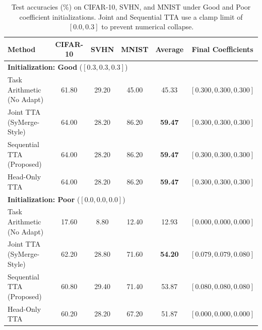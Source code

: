 \documentclass{article}
\theoremstyle{plain}
\theoremstyle{definition}
\theoremstyle{remark}
\begin{document}
\begin{table}[t]
\caption{Test accuracies (\%) on CIFAR-10, SVHN, and MNIST under Good and Poor coefficient initializations. Joint and Sequential TTA use a clamp limit of $[0.0, 0.3]$ to prevent numerical collapse.}
\label{tab:results}
\vskip 0.08in
\begin{center}
\begin{small}
\begin{sc}
\begin{tabular}{lccccc}
\toprule
Method & CIFAR-10 & SVHN & MNIST & Average & Final Coefficients \\
\midrule
\multicolumn{6}{l}{\textbf{Initialization: Good} ($[0.3, 0.3, 0.3]$)} \\
\midrule
Task Arithmetic (No Adapt) & 61.80 & 29.20 & 45.00 & 45.33 & $[0.300, 0.300, 0.300]$ \\
Joint TTA (SyMerge-Style)   & 64.00 & 28.20 & 86.20 & \textbf{59.47} & $[0.300, 0.300, 0.300]$ \\
Sequential TTA (Proposed)   & 64.00 & 28.20 & 86.20 & \textbf{59.47} & $[0.300, 0.300, 0.300]$ \\
Head-Only TTA               & 64.00 & 28.20 & 86.20 & \textbf{59.47} & $[0.300, 0.300, 0.300]$ \\
\midrule
\multicolumn{6}{l}{\textbf{Initialization: Poor} ($[0.0, 0.0, 0.0]$)} \\
\midrule
Task Arithmetic (No Adapt) & 17.60 & 8.80  & 12.40 & 12.93 & $[0.000, 0.000, 0.000]$ \\
Joint TTA (SyMerge-Style)   & 62.20 & 28.80 & 71.60 & \textbf{54.20} & $[0.079, 0.079, 0.080]$ \\
Sequential TTA (Proposed)   & 60.80 & 29.40 & 71.40 & 53.87 & $[0.080, 0.080, 0.080]$ \\
Head-Only TTA               & 60.20 & 28.20 & 67.20 & 51.87 & $[0.000, 0.000, 0.000]$ \\
\bottomrule
\end{tabular}
\end{sc}
\end{small}
\end{center}
\vskip -0.1in
\end{table}
\end{document}
